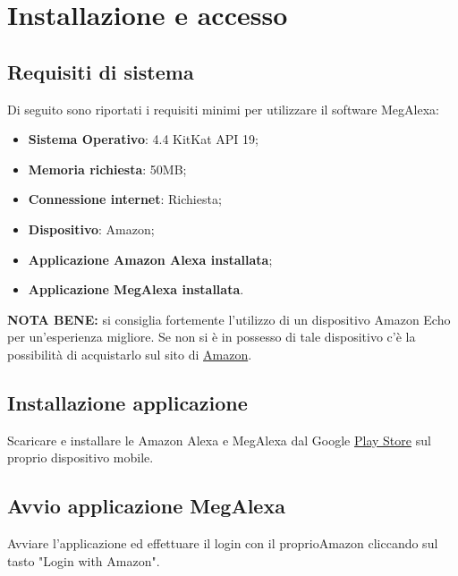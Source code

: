 \chapter{Installazione e accesso}


\section{Requisiti di sistema}
\label{Requisiti sistema}
Di seguito sono riportati i requisiti minimi per utilizzare il software MegAlexa:

\begin{itemize}
	\item \textbf{Sistema Operativo}:  4.4 KitKat API 19;
	\item \textbf{Memoria richiesta}: 50MB;
	\item \textbf{Connessione internet}: Richiesta;
	\item \textbf{Dispositivo}: Amazon;
	\item \textbf{Applicazione Amazon Alexa installata};
	\item \textbf{Applicazione MegAlexa installata}.
\end{itemize}

\textbf{NOTA BENE:} si consiglia fortemente l'utilizzo di un dispositivo Amazon Echo per un'esperienza migliore. Se non si è in possesso di tale dispositivo c'è la possibilità di acquistarlo sul sito di \href{https://www.amazon.it}{Amazon}.

\section{Installazione applicazione}
Scaricare e installare le  Amazon Alexa e MegAlexa dal Google \href{https://play.google.com/store/apps?hl=it}{Play Store} sul proprio dispositivo mobile.
\newpage
\section{Avvio applicazione MegAlexa}
\label{Installazione MegAlexa}
Avviare l'applicazione ed effettuare il login con il proprioAmazon cliccando sul tasto "Login with Amazon".


